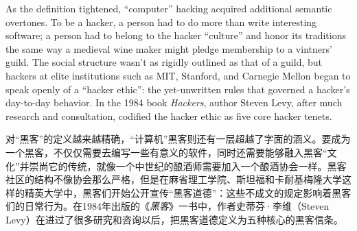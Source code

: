 \ifdefined\eng
As the definition tightened, ``computer'' hacking acquired additional semantic overtones. To be a hacker, a person had to do more than write interesting software; a person had to belong to the hacker ``culture'' and honor its traditions the same way a medieval wine maker might pledge membership to a vintners' guild. The social structure wasn't as rigidly outlined as that of a guild, but hackers at elite institutions such as MIT, Stanford, and Carnegie Mellon began to speak openly of a ``hacker ethic'': the yet-unwritten rules that governed a hacker's day-to-day behavior. In the 1984 book \textit{Hackers}, author Steven Levy, after much research and consultation, codified the hacker ethic as five core hacker tenets.
\fi

\ifdefined\chs
对``黑客''的定义越来越精确，``计算机''黑客则还有一层超越了字面的涵义。要成为一个黑客，不仅仅需要去编写一些有意义的软件，同时还需要能够融入黑客``文化''并崇尚它的传统，就像一个中世纪的酿酒师需要加入一个酿酒协会一样。黑客社区的结构不像协会那么严格，但是在麻省理工学院、斯坦福和卡耐基梅隆大学这样的精英大学中，黑客们开始公开宣传``黑客道德''：这些不成文的规定影响着黑客们的日常行为。在1984年出版的《\textit{黑客}》一书中，作者史蒂芬·李维（Steven Levy）在进过了很多研究和咨询以后，把黑客道德定义为五种核心的黑客信条。
\fi


